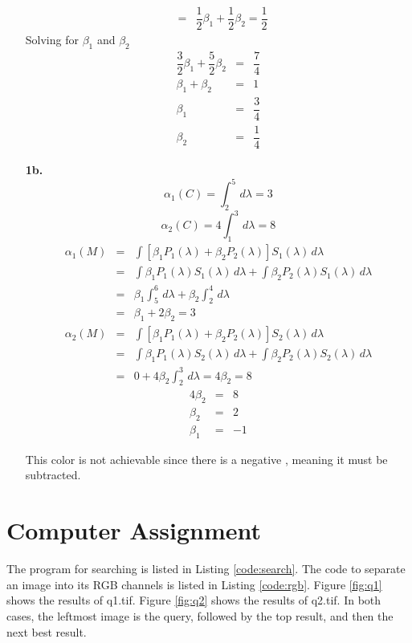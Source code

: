 \documentclass[10pt, a4paper]{article}
\begin{document}
\begin{enumerate}
\begin{eqnarray}
      &=& \dfrac{1}{2}\beta_1 + \dfrac{1}{2}\beta_2 = \dfrac{1}{2}
    \end{eqnarray}
    Solving for $\beta_1$ and $\beta_2$
    \begin{eqnarray}
      \dfrac{3}{2}\beta_1 + \dfrac{5}{2}\beta_2 &=& \dfrac{7}{4} \\  
      \beta_1 + \beta_2 &=& 1 \\
      \beta_1 &=& \dfrac{3}{4} \\
      \beta_2 &=& \dfrac{1}{4}
    \end{eqnarray}
  \item[\textbf{1b. }]
    \begin{equation}
      \alpha_1(C) = \int^5_2\, d\lambda = 3
    \end{equation}
    \begin{equation}
      \alpha_2(C) = 4\int^3_1\, d\lambda = 8
    \end{equation}
    \begin{eqnarray}
      \alpha_1(M) &=& \int \left[\beta_1 P_1(\lambda) + \beta_2 P_2(\lambda)\right]S_1(\lambda)\, d\lambda \\
      &=& \int \beta_1 P_1(\lambda) S_1(\lambda)\, d\lambda + \int \beta_2 P_2(\lambda) S_1(\lambda)\, d\lambda \\
      &=& \beta_1 \int^6_5\, d\lambda + \beta_2 \int^4_2\, d\lambda \\
      &=& \beta_1 + 2\beta_2 = 3
    \end{eqnarray}
    \begin{eqnarray}
      \alpha_2(M) &=& \int \left[\beta_1 P_1(\lambda) + \beta_2 P_2(\lambda)\right]S_2(\lambda)\, d\lambda \\
      &=& \int \beta_1 P_1(\lambda) S_2(\lambda)\, d\lambda + \int \beta_2 P_2(\lambda) S_2(\lambda)\, d\lambda \\
      &=& 0 + 4\beta_2\int^3_2\, d\lambda = 4\beta_2 = 8
    \end{eqnarray}
    \begin{eqnarray}
      4\beta_2 &=& 8 \\
      \beta_2 &=& 2 \\
      \beta_1 &=& -1
    \end{eqnarray}

    This color is not achievable since there is a negative \beta, meaning it must be subtracted.

\end{enumerate}

\section{Computer Assignment}
The program for searching is listed in Listing \ref{code:search}. The code to separate an image into
its RGB channels is listed in Listing \ref{code:rgb}. Figure \ref{fig:q1} shows the results of q1.tif.
Figure \ref{fig:q2} shows the results of q2.tif. In both cases, the leftmost image is the query, followed
by the top result, and then the next best result.
\end{document}
